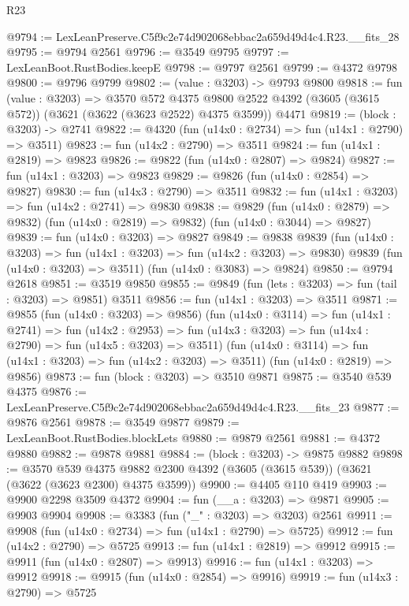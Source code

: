 \begin{lexlean}{R23}
\begin{coremodule}
@9794 := LexLeanPreserve.C5f9c2e74d902068ebbac2a659d49d4c4.R23.__fits_28
@9795 := @9794 @2561
@9796 := @3549 @9795
@9797 := LexLeanBoot.RustBodies.keepE
@9798 := @9797 @2561
@9799 := @4372 @9798
@9800 := @9796 @9799
@9802 := (value : @3203) -> @9793 @9800
@9818 := fun (value : @3203) =>
  @3570
    @572
    @4375
    @9800
    @2522
    @4392
    (@3605 (@3615 @572))
    (@3621 (@3622 (@3623 @2522) @4375 @3599))
    @4471
@9819 := (block : @3203) -> @2741
@9822 := @4320 (fun (u14x0 : @2734) => fun (u14x1 : @2790) => @3511)
@9823 := fun (u14x2 : @2790) => @3511
@9824 := fun (u14x1 : @2819) => @9823
@9826 := @9822 (fun (u14x0 : @2807) => @9824)
@9827 := fun (u14x1 : @3203) => @9823
@9829 := @9826 (fun (u14x0 : @2854) => @9827)
@9830 := fun (u14x3 : @2790) => @3511
@9832 := fun (u14x1 : @3203) => fun (u14x2 : @2741) => @9830
@9838 := @9829
    (fun (u14x0 : @2879) => @9832)
    (fun (u14x0 : @2819) => @9832)
    (fun (u14x0 : @3044) => @9827)
@9839 := fun (u14x0 : @3203) => @9827
@9849 := @9838
    @9839
    (fun (u14x0 : @3203) => fun (u14x1 : @3203) => fun (u14x2 : @3203) => @9830)
    @9839
    (fun (u14x0 : @3203) => @3511)
    (fun (u14x0 : @3083) => @9824)
@9850 := @9794 @2618
@9851 := @3519 @9850
@9855 := @9849 (fun (lets : @3203) => fun (tail : @3203) => @9851) @3511
@9856 := fun (u14x1 : @3203) => @3511
@9871 := @9855
    (fun (u14x0 : @3203) => @9856)
    (fun (u14x0 : @3114) =>
    fun (u14x1 : @2741) =>
    fun (u14x2 : @2953) =>
    fun (u14x3 : @3203) => fun (u14x4 : @2790) => fun (u14x5 : @3203) => @3511)
    (fun (u14x0 : @3114) => fun (u14x1 : @3203) => fun (u14x2 : @3203) => @3511)
    (fun (u14x0 : @2819) => @9856)
@9873 := fun (block : @3203) => @3510 @9871
@9875 := @3540 @539 @4375
@9876 := LexLeanPreserve.C5f9c2e74d902068ebbac2a659d49d4c4.R23.__fits_23
@9877 := @9876 @2561
@9878 := @3549 @9877
@9879 := LexLeanBoot.RustBodies.blockLets
@9880 := @9879 @2561
@9881 := @4372 @9880
@9882 := @9878 @9881
@9884 := (block : @3203) -> @9875 @9882
@9898 := @3570
    @539
    @4375
    @9882
    @2300
    @4392
    (@3605 (@3615 @539))
    (@3621 (@3622 (@3623 @2300) @4375 @3599))
@9900 := @4405 @110 @419
@9903 := @9900 @2298 @3509 @4372
@9904 := fun (__a : @3203) => @9871
@9905 := @9903 @9904
@9908 := @3383 (fun ("_" : @3203) => @3203) @2561
@9911 := @9908 (fun (u14x0 : @2734) => fun (u14x1 : @2790) => @5725)
@9912 := fun (u14x2 : @2790) => @5725
@9913 := fun (u14x1 : @2819) => @9912
@9915 := @9911 (fun (u14x0 : @2807) => @9913)
@9916 := fun (u14x1 : @3203) => @9912
@9918 := @9915 (fun (u14x0 : @2854) => @9916)
@9919 := fun (u14x3 : @2790) => @5725

\end{coremodule}
\end{lexlean}
